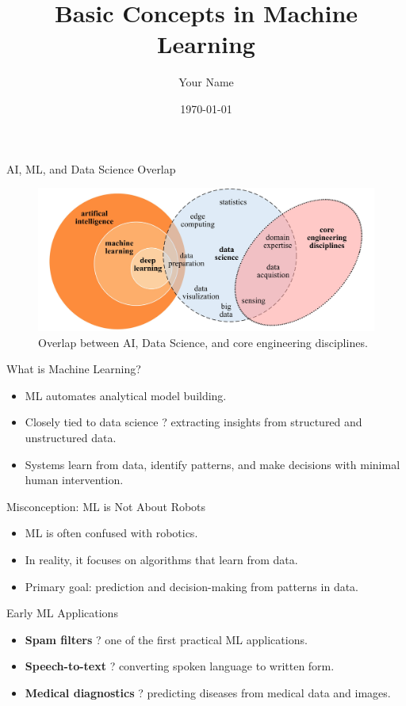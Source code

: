 \documentclass[aspectratio=169]{beamer}
\title{Basic Concepts in Machine Learning}
\author{Your Name}
\date{\today}
\begin{document}
\frame{\titlepage}

\begin{frame}{AI, ML, and Data Science Overlap}
\begin{figure}
    \centering
    \includegraphics[width=\linewidth]{../figures/AI-vs-ML-vs-Deep-Learning}
    \caption{Overlap between AI, Data Science, and core engineering disciplines.}
\end{figure}
\end{frame}

\begin{frame}{What is Machine Learning?}
\begin{itemize}
    \item ML automates analytical model building.
    \item Closely tied to data science ? extracting insights from structured and unstructured data.
    \item Systems learn from data, identify patterns, and make decisions with minimal human intervention.
\end{itemize}
\end{frame}

\begin{frame}{Misconception: ML is Not About Robots}
\begin{itemize}
    \item ML is often confused with robotics.
    \item In reality, it focuses on algorithms that learn from data.
    \item Primary goal: prediction and decision-making from patterns in data.
\end{itemize}
\end{frame}

\begin{frame}{Early ML Applications}
\begin{itemize}
    \item \textbf{Spam filters} ? one of the first practical ML applications.
    \item \textbf{Speech-to-text} ? converting spoken language to written form.
    \item \textbf{Medical diagnostics} ? predicting diseases from medical data and images.
\end{itemize}
\end{frame}
\end{document}
